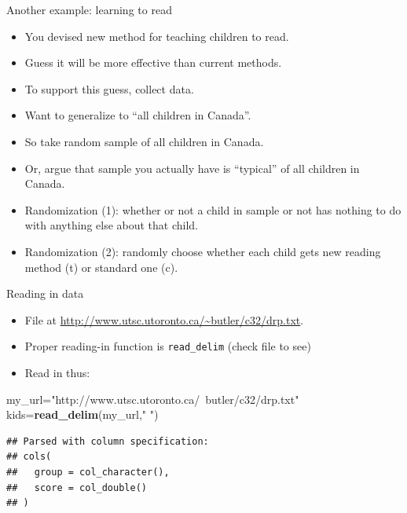 \documentclass[ignorenonframetext,]{beamer}
\newenvironment{Shaded}{\begin{snugshade}}{\end{snugshade}}
\newcommand{\KeywordTok}[1]{\textcolor[rgb]{0.13,0.29,0.53}{\textbf{#1}}}
\newcommand{\NormalTok}[1]{#1}
\newcommand{\StringTok}[1]{\textcolor[rgb]{0.31,0.60,0.02}{#1}}
\providecommand{\tightlist}{%
  \setlength{\itemsep}{0pt}\setlength{\parskip}{0pt}}
\begin{document}
\begin{frame}{Another example: learning to read}
\protect\hypertarget{another-example-learning-to-read}{}

\begin{itemize}
\tightlist
\item
  You devised new method for teaching children to read.
\item
  Guess it will be more effective than current methods.
\item
  To support this guess, collect data.
\item
  Want to generalize to ``all children in Canada''.
\item
  So take random sample of all children in Canada.
\item
  Or, argue that sample you actually have is ``typical'' of all children
  in Canada.
\item
  Randomization (1): whether or not a child in sample or not has nothing
  to do with anything else about that child.
\item
  Randomization (2): randomly choose whether each child gets new reading
  method (t) or standard one (c).
\end{itemize}

\end{frame}

\begin{frame}[fragile]{Reading in data}
\protect\hypertarget{reading-in-data-1}{}

\begin{itemize}
\tightlist
\item
  File at \url{http://www.utsc.utoronto.ca/~butler/c32/drp.txt}.
\item
  Proper reading-in function is \texttt{read\_delim} (check file to see)
\item
  Read in thus:
\end{itemize}

\begin{Shaded}
\begin{Highlighting}[]
\NormalTok{my_url=}\StringTok{"http://www.utsc.utoronto.ca/~butler/c32/drp.txt"}
\NormalTok{kids=}\KeywordTok{read_delim}\NormalTok{(my_url,}\StringTok{" "}\NormalTok{)}
\end{Highlighting}
\end{Shaded}

\begin{verbatim}
## Parsed with column specification:
## cols(
##   group = col_character(),
##   score = col_double()
## )
\end{verbatim}

\end{frame}
\end{document}
